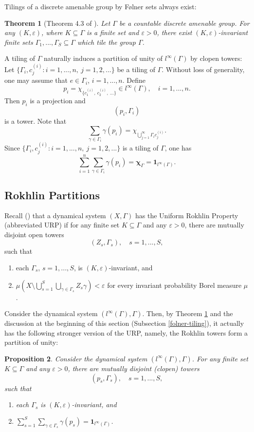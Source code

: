 \documentclass[12pt, oneside, psamsfonts]{amsart}
\newtheorem{thm}{Theorem}[section]
\newtheorem{prop}[thm]{Proposition}
\theoremstyle{definition}
\theoremstyle{remark}
\numberwithin{equation}{section}
\newcommand{\eps}{\varepsilon}
\begin{document}
Tilings of a discrete amenable group by F{\o}lner sets always exist:
\begin{thm}[Theorem 4.3 of \cite{DHZ-tiling}]\label{tiling-exists}
Let $\Gamma$ be a countable discrete amenable group. For any $(K, \eps)$, where $ K \subseteq \Gamma$ is a finite set and $\eps>0$, there exist $(K, \eps)$-invariant finite sets $\Gamma_1, ..., \Gamma_S \subseteq \Gamma$ which tile the group $\Gamma$.
\end{thm}

A tiling of $\Gamma$ naturally induces a partition of unity of $l^\infty(\Gamma)$ by clopen towers: Let $\{\Gamma_i, c_j^{(i)}: i=1, ..., n,\ j=1, 2, ... \}$ be a tiling of $\Gamma$. Without loss of generality, one may assume that $e \in \Gamma_i$, $i=1, ..., n$. Define $$p_i = \chi_{\{c^{(i)}_1,\   c^{(i)}_2,\ ... \} } \in l^\infty(\Gamma),\quad i=1, ..., n.$$ Then $p_i$ is a projection and 
$$(p_i, \Gamma_i)$$
is a tower. Note that
$$ \sum_{\gamma \in \Gamma_i} \gamma(p_i) = \chi_{ \bigcup_{j=1}^\infty \Gamma_i c_j^{(i)} }. $$ Since $\{\Gamma_i, c_j^{(i)}: i=1, ..., n,\ j=1, 2, ... \}$ is a tiling of $\Gamma$, one has
$$ \sum_{i=1}^n \sum_{\gamma \in \Gamma_i} \gamma(p_i) = \mathbf \chi_\Gamma = \mathbf 1_{l^\infty(\Gamma)}. $$ 



\subsection{Rokhlin Partitions}

Recall (\cite{Niu-MD-Z}) that a dynamical system $(X, \Gamma)$ has the Uniform Rokhlin Property (abbreviated URP) if for any finite set $K \subseteq \Gamma$ and any $\eps>0$, there are mutually disjoint open towers $$(Z_s, \Gamma_s),\quad s=1, ..., S,$$
such that
\begin{enumerate}
\item each $\Gamma_s$, $s=1, ..., S$, is $(K, \eps)$-invariant, and
\item $\mu(X \setminus \bigcup_{s=1}^S \bigcup_{\gamma \in \Gamma_s} Z_s\gamma) < \eps$ for every invariant probability Borel measure $\mu$.
\end{enumerate}

Consider the dynamical system $(l^\infty(\Gamma), \Gamma)$. Then, by Theorem \ref{tiling-exists} and the discussion at the beginning of this section (Subsection \ref{folner-tiling}), it actually has the following stronger version of the URP, namely, the Rokhlin towers form a partition of unity:
\begin{prop}\label{S-URP}
Consider the dynamical system $(l^\infty(\Gamma), \Gamma)$. For any finite set $K \subseteq \Gamma$ and any $\eps>0$, there are mutually disjoint (clopen) towers $$(p_s, \Gamma_s),\quad s=1, ..., S,$$
such that
\begin{enumerate}
\item each $\Gamma_s$ is $(K, \eps)$-invariant, and
\item $\sum_{s=1}^S \sum_{\gamma \in \Gamma_s} \gamma(p_s) = \mathbf 1_{l^\infty(\Gamma)}$.
\end{enumerate}
\end{prop}
\end{document}
